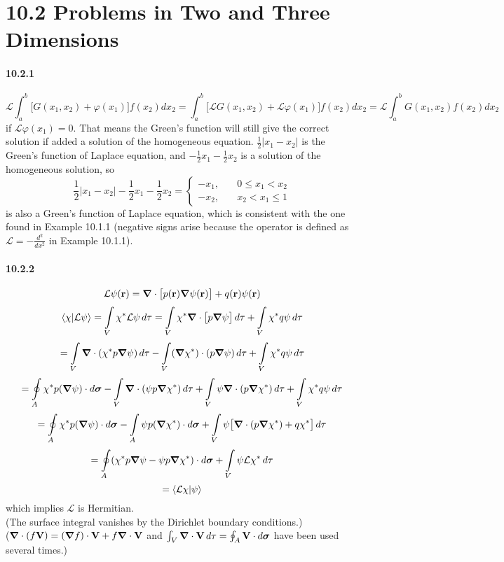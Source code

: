 \documentclass[a4paper]{article}
\begin{document}
\section*{10.2 Problems in Two and Three Dimensions}

\paragraph{10.2.1}
\[
\mathcal{L}\int_a^b\Big[G(x_1,x_2)+\varphi(x_1)\Big]f(x_2)dx_2=\int_a^b\Big[\mathcal{
L}G(x_1,x_2)+\mathcal{L}\varphi(x_1)\Big]f(x_2)dx_2=\mathcal{L}\int_a^bG(x_1,x_2)f(x_2)dx_2
\]
if $\mathcal{L}\varphi(x_1)=0$. That means
the Green's function will still give the correct solution if added a solution of the homogeneous equation.
$\frac{1}{2}|x_1-x_2|$ is the Green's function of Laplace equation, and $-\frac{1}{2}x_1-\frac{1}{2}x_2$ is a solution of the homogeneous solution, so 
\[
\frac{1}{2}|x_1-x_2|-\frac{1}{2}x_1-\frac{1}{2}x_2=
\begin{cases}
-x_1,\quad & 0\leq x_1<x_2\\
-x_2,\quad & x_2<x_1\leq1
\end{cases}
\]
is also a Green's function of Laplace equation, which is consistent with the one found in Example 10.1.1 (negative signs arise because the operator is defined as $\mathcal{L}=-\frac{d^2}{dx^2}$ in Example 10.1.1).

\paragraph{10.2.2}
\[
\mathcal{L}\psi(\mathbf{r})=\boldsymbol{\nabla}\cdot\big[p(\mathbf{r})\boldsymbol{\nabla}\psi(\mathbf{r}) \big]+q(\mathbf{r})\psi(\mathbf{r})
\]
\[
\langle\chi|\mathcal{L}\psi\rangle=\int\displaylimits_V\chi^*\mathcal{L}\psi\,d\tau=\int\displaylimits_V\chi^*\boldsymbol{\nabla}\cdot\big[p\boldsymbol{\nabla}\psi\big]\,d\tau+\int\displaylimits_V\chi^*q\psi\,d\tau
\]
\[
=\int\displaylimits_V\boldsymbol{\nabla}\cdot(\chi^*p\boldsymbol{\nabla}\psi)\,d\tau-\int\displaylimits_V(\boldsymbol{\nabla}\chi^*)\cdot(p\boldsymbol{\nabla}\psi)\,d\tau+\int\displaylimits_V\chi^*q\psi\,d\tau
\]
\[
=\oint\displaylimits_A\chi^*p(\boldsymbol{\nabla}\psi)\cdot d\boldsymbol{\sigma}-\int\displaylimits_V\boldsymbol{\nabla}\cdot(\psi p\boldsymbol{\nabla}\chi^*)\,d\tau+\int\displaylimits_V\psi\boldsymbol{\nabla}\cdot(p\boldsymbol{\nabla}\chi^*)\,d\tau+\int\displaylimits_V\chi^*q\psi\,d\tau
\]
\[
=\oint\displaylimits_A\chi^*p(\boldsymbol{\nabla}\psi)\cdot d\boldsymbol{\sigma}-\int\displaylimits_A\psi p(\boldsymbol{\nabla}\chi^*)\cdot d\boldsymbol{\sigma} +\int\displaylimits_V\psi\big[\boldsymbol{\nabla}\cdot(p\boldsymbol{\nabla}\chi^*)+q\chi^*\big]\,d\tau
\]
\[
=\oint\displaylimits_A(\chi^*p\boldsymbol{\nabla}\psi-\psi p\boldsymbol{\nabla}\chi^*)\cdot d\boldsymbol{\sigma}+\int\displaylimits_V\psi\mathcal{L}\chi^*\,d\tau
\]
\[
=\langle\mathcal{L}\chi|\psi\rangle
\]
which implies $\mathcal{L}$ is Hermitian. \\(The surface integral vanishes by the Dirichlet boundary conditions.) \\($\boldsymbol{\nabla}\cdot(f\mathbf{V})=(\boldsymbol{\nabla} f)\cdot\mathbf{V}+f\boldsymbol{\nabla}\cdot\mathbf{V}$ and $\int_V\boldsymbol{\nabla}\cdot\mathbf{V}\,d\tau=\oint_A\mathbf{V}\cdot d\boldsymbol{\sigma}$ have been used several times.)
\end{document}
